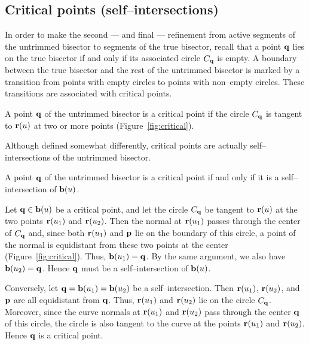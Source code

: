 \subsection{Critical points (self--intersections)}

In order to make the second --- and final --- refinement from
active segments of the untrimmed bisector to segments of the true
bisector, recall that a point ${\bf q}$ lies on the true bisector
if and only if its associated circle $C_{\bf q}$ is empty. A boundary
between the true bisector and the rest of the untrimmed bisector is
marked by a transition from points with empty circles to points with
non--empty circles. These transitions are associated with critical
points.

\begin{dfn}
\label{d:cri}
A point ${\bf q}$ of the untrimmed bisector is a {\rm critical point}
if the circle $C_{\bf q}$ is tangent to ${\bf r}(u)$ at two or more
points (Figure~\ref{fig:critical}).
\end{dfn}

Although defined somewhat differently, critical points are actually
self--intersections of the untrimmed bisector.


\begin{propn}
\label{prop:cri}
A point ${\bf q}$ of the untrimmed bisector is a critical point if and
only if it is a self--intersection of ${\bf b}(u)$.
\end{propn}

\prf Let ${\bf q} \in {\bf b}(u)$ be a critical point, and let the
circle $C_{\bf q}$ be tangent to ${\bf r}(u)$ at the two points
${\bf r}(u_1)$ and ${\bf r}(u_2)$. Then the normal at ${\bf r}(u_1)$
passes through the center of $C_{\bf q}$ and, since both ${\bf r}
(u_1)$ and ${\bf p}$ lie on the boundary of this circle, a point
of the normal is equidistant from these two points at the center
(Figure~\ref{fig:critical}). Thus, ${\bf b}(u_{1}) = {\bf q}$. By
the same argument, we also have ${\bf b}(u_{2}) = {\bf q}$. Hence
${\bf q}$ must be a self--intersection of ${\bf b}(u)$.

Conversely, let ${\bf q}={\bf b}(u_{1})={\bf b}(u_{2})$ be a
self--intersection. Then ${\bf r}(u_{1})$, ${\bf r}(u_{2})$, and
${\bf p}$ are all equidistant from ${\bf q}$. Thus, ${\bf r}(u_{1})$
and ${\bf r}(u_{2})$ lie on the circle $C_{\bf q}$. Moreover, since
the curve normals at ${\bf r}(u_{1})$ and ${\bf r}(u_{2})$ pass
through the center ${\bf q}$ of this circle, the circle is also
tangent to the curve at the points ${\bf r}(u_{1})$ and ${\bf r}
(u_{2})$. Hence ${\bf q}$ is a critical point. \QED

